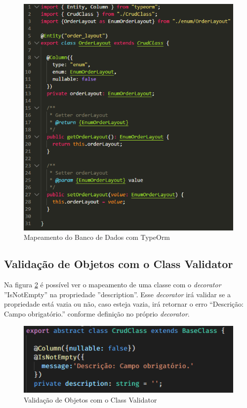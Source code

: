 \begin{figure}[htb]
	\caption{\label{code_server_type-orm}Mapeamento do Banco de Dados com TypeOrm}
	\begin{center}
		\includegraphics[scale=0.60]{./Figuras/code/server/type-orm.png}
	\end{center}
\end{figure}

\subsection{Validação de Objetos com o Class Validator}


Na figura \ref{code_server_class-validator} é possível ver o mapeamento de uma classe com o \textit{decorator} ''IsNotEmpty'' na propriedade ''description''. Esse \textit{decorator} irá validar se a propriedade está vazia ou não, caso esteja vazia, irá retornar o erro ``Descrição: Campo obrigatório.'' conforme definição no próprio \textit{decorator}.

\begin{figure}[htb]
	\caption{\label{code_server_class-validator}Validação de Objetos com o Class Validator}
	\begin{center}
		\includegraphics[scale=1.30]{./Figuras/code/server/class-validator.png}
	\end{center}
\end{figure}





